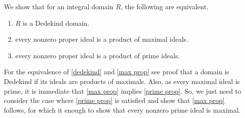 \documentclass[12pt]{article}
\begin{document}
 We show that for an integral domain $R$, the following are equivalent.
\begin{enumerate}
\item $R$ is a Dedekind domain.\label{dedekind}
\item every nonzero proper ideal is a product of maximal ideals.\label{max prop}
\item every nonzero proper ideal is a product of prime ideals.\label{prime prop}
\end{enumerate}
For the equivalence of \ref{dedekind} and \ref{max prop} see proof that a domain is Dedekind if its ideals 
are products of maximals. Also, as every maximal ideal is prime, it is immediate that \ref{max prop} implies \ref{prime prop}. So, we just need to consider the case where \ref{prime prop} is satisfied and show that \ref{max prop} follows, for which it enough to show that every nonzero prime ideal is maximal.
\end{document}
